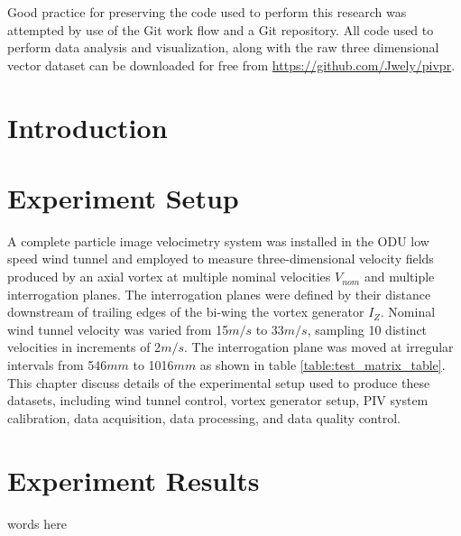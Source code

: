 \documentclass[12pt]{report}
\begin{document}
Good practice for preserving the code used to perform this research was 
attempted by use of the Git work flow and a Git repository. All code used to 
perform data analysis and visualization, along with the raw three dimensional 
vector dataset can be downloaded for free from 
\url{https://github.com/Jwely/pivpr}.
	

\afterpreface

\chapter{Introduction}




\chapter{Experiment Setup}
A complete particle image velocimetry system was installed in the ODU low speed 
wind tunnel and employed to measure three-dimensional velocity fields produced 
by an axial vortex at multiple nominal velocities $V_{nom}$ and multiple 
interrogation planes. The interrogation planes were defined by their 
distance downstream of trailing edges of the bi-wing the vortex generator 
$I_Z$. Nominal wind tunnel velocity was varied from 15$m/s$ to 33$m/s$, 
sampling 10 distinct velocities in increments of 2$m/s$. The interrogation 
plane was moved at irregular intervals from 546$mm$ to 1016$mm$ as shown in 
table \ref{table:test_matrix_table}. This chapter discuss details of the 
experimental setup used to produce these datasets, including wind tunnel 
control, vortex generator setup, PIV system calibration, data acquisition, data 
processing, and data quality control.










\chapter{Experiment Results}
words here
\end{document}
